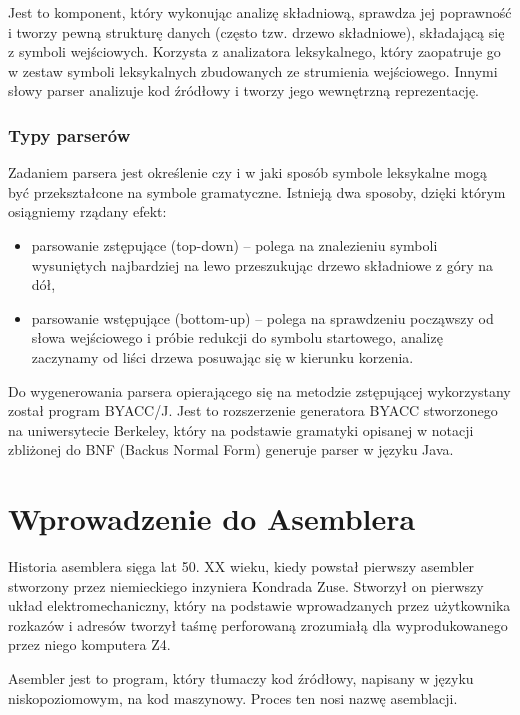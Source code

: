 \documentclass[a4paper,12pt]{article}
\begin{document}
Jest to komponent, który wykonując analizę składniową, sprawdza jej poprawność i tworzy pewną strukturę danych (często tzw. drzewo składniowe), składającą się z symboli wejściowych. Korzysta z analizatora leksykalnego, który zaopatruje go w zestaw symboli leksykalnych zbudowanych ze strumienia wejściowego. Innymi słowy parser analizuje kod źródłowy i tworzy jego wewnętrzną reprezentację.

\subsubsection{Typy parserów}

Zadaniem parsera jest określenie czy i w jaki sposób symbole leksykalne mogą być przekształcone na symbole gramatyczne. Istnieją dwa sposoby, dzięki którym osiągniemy rządany efekt:
\begin{itemize}
	\item parsowanie zstępujące (top-down) -- polega na znalezieniu symboli wysuniętych najbardziej na lewo przeszukując drzewo składniowe z góry na dół,
	\item parsowanie wstępujące (bottom-up) -- polega na sprawdzeniu począwszy od słowa wejściowego i próbie redukcji do symbolu startowego, analizę zaczynamy od liści drzewa posuwając się w kierunku korzenia.
\end{itemize}

Do wygenerowania parsera opierającego się na metodzie zstępującej wykorzystany został program BYACC/J\cite{byaccj}. Jest to rozszerzenie generatora BYACC stworzonego na uniwersytecie Berkeley\cite{byacc}, który na podstawie gramatyki opisanej w notacji zbliżonej do BNF (Backus Normal Form)\cite{bnf} generuje parser w języku Java.

\newpage

\section{Wprowadzenie do Asemblera}

Historia asemblera sięga lat 50. XX wieku, kiedy powstał pierwszy asembler stworzony przez niemieckiego inzyniera Kondrada Zuse. Stworzył on pierwszy układ elektromechaniczny, który na podstawie wprowadzanych przez użytkownika rozkazów i adresów tworzył taśmę perforowaną zrozumiałą dla wyprodukowanego przez niego komputera Z4.

Asembler jest to program, który tłumaczy kod źródłowy, napisany w języku niskopoziomowym, na kod maszynowy. Proces ten nosi nazwę asemblacji. 
\end{document}
